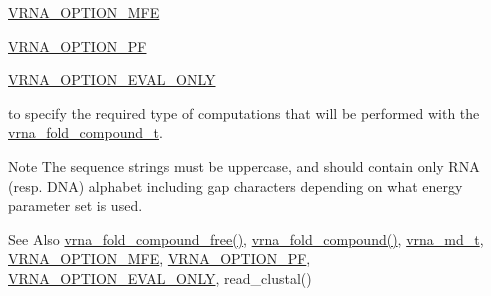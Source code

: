 \begin{DoxyItemize}
\item \hyperlink{group__fold__compound_gae63be9127fe7dcc1f9bb14f5bb1064ee}{V\-R\-N\-A\-\_\-\-O\-P\-T\-I\-O\-N\-\_\-\-M\-F\-E}
\item \hyperlink{group__fold__compound_gabfbadcddda3e74ce7f49035ef8f058f7}{V\-R\-N\-A\-\_\-\-O\-P\-T\-I\-O\-N\-\_\-\-P\-F}
\item \hyperlink{group__fold__compound_ga61469c423131552c8483229f8b6c7e0e}{V\-R\-N\-A\-\_\-\-O\-P\-T\-I\-O\-N\-\_\-\-E\-V\-A\-L\-\_\-\-O\-N\-L\-Y}
\end{DoxyItemize}

to specify the required type of computations that will be performed with the \hyperlink{group__fold__compound_ga1b0cef17fd40466cef5968eaeeff6166}{vrna\-\_\-fold\-\_\-compound\-\_\-t}.

\begin{DoxyNote}{Note}
The sequence strings must be uppercase, and should contain only R\-N\-A (resp. D\-N\-A) alphabet including gap characters depending on what energy parameter set is used.
\end{DoxyNote}
\begin{DoxySeeAlso}{See Also}
\hyperlink{group__fold__compound_gadded6039d63f5d6509836e20321534ad}{vrna\-\_\-fold\-\_\-compound\-\_\-free()}, \hyperlink{group__fold__compound_ga6601d994ba32b11511b36f68b08403be}{vrna\-\_\-fold\-\_\-compound()}, \hyperlink{group__model__details_ga1f8a10e12a0a1915f2a4eff0b28ea17c}{vrna\-\_\-md\-\_\-t}, \hyperlink{group__fold__compound_gae63be9127fe7dcc1f9bb14f5bb1064ee}{V\-R\-N\-A\-\_\-\-O\-P\-T\-I\-O\-N\-\_\-\-M\-F\-E}, \hyperlink{group__fold__compound_gabfbadcddda3e74ce7f49035ef8f058f7}{V\-R\-N\-A\-\_\-\-O\-P\-T\-I\-O\-N\-\_\-\-P\-F}, \hyperlink{group__fold__compound_ga61469c423131552c8483229f8b6c7e0e}{V\-R\-N\-A\-\_\-\-O\-P\-T\-I\-O\-N\-\_\-\-E\-V\-A\-L\-\_\-\-O\-N\-L\-Y}, read\-\_\-clustal()
\end{DoxySeeAlso}

